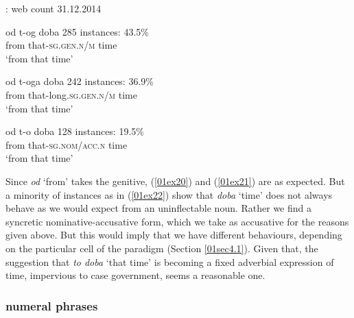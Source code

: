 \documentclass[output=paper,colorlinks,citecolor=brown]{langscibook}
\begin{document}
\vspace{0.4cm}

\noindent \citet[12]{browne2015}: web count 31.12.2014
\begin{exe}
	\ex \label{01ex20}
	\gll od t-og doba \hspace{2.8cm} 285 instances: 43.5\% \\
	from that-\textsc{sg.gen.n/m} time \\
	\trans ‘from that time’
	
	\ex \label{01ex21}
	\gll od t-oga doba \hspace{2cm} 242 instances: 36.9\% \\
	from that-long.\textsc{sg.gen.n/m} time \\
	\trans ‘from that time’
	
	\ex \label{01ex22}
	\gll od t-o doba \hspace{2.4cm} 128 instances: 19.5\% \\
	from that-\textsc{sg.nom/acc.n} time \\
	\trans ‘from that time’
\end{exe}

Since \textit{od} `from' takes the genitive, (\ref{01ex20}) and (\ref{01ex21}) are as expected. But a minority of instances as in (\ref{01ex22}) show that \textit{doba} `time' does not always behave as we would expect from an uninflectable noun. Rather we find a syncretic nominative-accusative form, which we take as accusative for the reasons given above. But this would imply that we have different behaviours, depending on the particular cell of the paradigm (Section \ref{01sec4.1}). Given that, the suggestion that \textit{to doba} `that time' is becoming a fixed adverbial expression of time, impervious to case government, seems a reasonable one.

\subsubsection{ numeral phrases} \label{01sec6.2.2}
\end{document}
